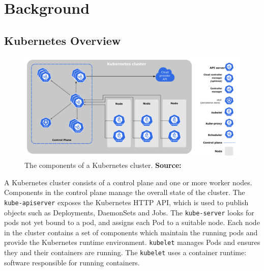 \chapter{Background}

%
%

\section{Kubernetes Overview}

\begin{figure}[H]
    \centering
    \includegraphics[width=\textwidth]{images/components-of-kubernetes.pdf}
    \caption{The components of a Kubernetes cluster. \textbf{Source:}
    \cite{kubernetes-components}}
    \label{kube-components}
\end{figure}

A Kubernetes cluster consists of a control plane and one or more worker nodes.
Components in the control plane manage the overall state of the cluster. The
\verb|kube-apiserver| exposes the Kubernetes HTTP API, which is used to publish
objects such as Deployments, DaemonSets and Jobs. The \verb|kube-server| looks
for pods not yet bound to a pod, and assigns each Pod to a suitable node. Each
node in the cluster contains a set of components which maintain the running pods
and provide the Kubernetes runtime environment. \verb|kubelet| manages Pods and
ensures they and their containers are running. The \verb|kubelet| uses a
container runtime: software responsible for running containers.


